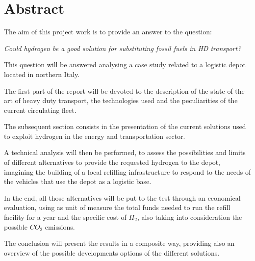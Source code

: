 \chapter*{Abstract} 
The aim of this project work is to provide an answer to the question:

\textit{Could hydrogen be a good solution for substituting fossil fuels in HD transport?}

This question will be answered analysing a case study related to a logistic depot located in northern Italy.

The first part of the report will be devoted to the description of the state of the art of heavy duty transport, the technologies used and the peculiarities of the current circulating fleet.

The subsequent section consists in the presentation of the current solutions used to exploit hydrogen in the energy and transportation sector.

A technical analysis will then be performed, to assess the possibilities and limits of different alternatives to provide the requested hydrogen to the depot, imagining the building of a local refilling infrastructure to respond to the needs of the vehicles that use the depot as a logistic base.

In the end, all those alternatives will be put to the test through an economical evaluation, using as unit of measure the total funds needed to run the refill facility for a year and the specific cost of $H_2$, also taking into consideration the possible $CO_2$ emissions.

The conclusion will present the results in a composite way, providing also an overview of the possible developments options of the different solutions.